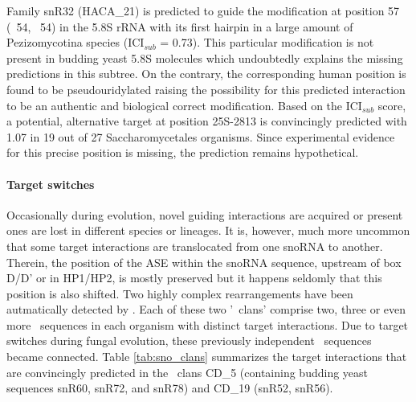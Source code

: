 Family snR32 (HACA\_21) is predicted to guide the modification at
position 57 (\ncr\ 54, \sce\ 54) in the 5.8S rRNA with its first
hairpin in a large amount of Pezizomycotina species (ICI$_{sub}$ =
0.73). This particular modification is not present in budding yeast
5.8S molecules which undoubtedly explains the missing predictions in
this subtree. On the contrary, the corresponding human position is
found to be pseudouridylated raising the possibility for this
predicted interaction to be an authentic and biological correct
modification.  Based on the ICI$_{sub}$ score, a potential,
alternative target at position 25S-2813 is convincingly predicted with
1.07 in 19 out of 27 Saccharomycetales organisms. Since experimental
evidence for this precise position is missing, the prediction remains
hypothetical.

\paragraph{\textbf{Target switches}}
Occasionally during evolution, novel guiding interactions are acquired
or present ones are lost in different species or lineages. It is,
however, much more uncommon that some target interactions are
translocated from one snoRNA to another. Therein, the position of the
ASE within the snoRNA sequence, upstream of box D/D’ or in HP1/HP2, is
mostly preserved but it happens seldomly that this position is also
shifted. Two highly complex rearrangements have been autmatically
detected by \snostrip. Each of these two '\sno\ clans' comprise two,
three or even more \sno\ sequences in each organism with distinct
target interactions. Due to target switches during fungal evolution,
these previously independent \sno\ sequences became connected. Table
\ref{tab:sno_clans} summarizes the target interactions that are
convincingly predicted in the \sno\ clans CD\_5 (containing budding
yeast sequences snR60, snR72, and snR78) and CD\_19 (snR52, snR56).

